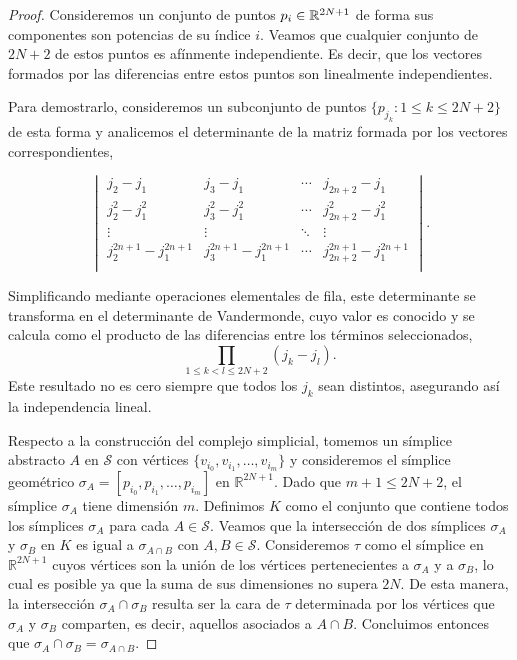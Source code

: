 \begin{proof}
	Consideremos un conjunto de puntos \(p_i \in \mathbb{R}^{2N+1} \) de forma sus componentes son potencias de su índice \(i\). Veamos que cualquier conjunto de \(2N+2\) de estos puntos es afínmente independiente. Es decir, que los vectores formados por las diferencias entre estos puntos son linealmente independientes.
	
	Para demostrarlo, consideremos un subconjunto de puntos \(\{p_{j_k} : 1 \leq k \leq 2N+2\}\) de esta forma y analicemos el determinante de la matriz formada por los vectores correspondientes,
	
	\[
	\begin{vmatrix}
		j_{2} - j_{1}              & j_{3} - j_{1}              & \cdots & j_{2n+2}- j_{1}               \\
		j_{2}^{2} - j_{1}^{2}      & j_{3}^{2} - j_{1}^{2}      & \cdots & j_{2n+2}^{2} - j_{1}^{2}      \\
		\vdots                     & \vdots                     & \ddots & \vdots                        \\
		j_{2}^{2n+1}- j_{1}^{2n+1} & j_{3}^{2n+1}- j_{1}^{2n+1} & \cdots & j_{2n+2}^{2n+1}- j_{1}^{2n+1} \\
	\end{vmatrix}
	.
	\]
	
	Simplificando mediante operaciones elementales de fila, este determinante se transforma en el determinante de Vandermonde, cuyo valor es conocido y se calcula como el producto de las diferencias entre los términos seleccionados, \[\prod_{1 \leq k < l \leq 2N+2}(j_k - j_l).\] Este resultado no es cero siempre que todos los \(j_k\) sean distintos, asegurando así la independencia lineal.
	
	Respecto a la construcción del complejo simplicial, tomemos un símplice abstracto \(A\) en \(\mathcal{S}\) con vértices \(\{v_{i_0}, v_{i_1}, \ldots, v_{i_m}\}\) y consideremos el símplice geométrico \(\sigma_A = [p_{i_0}, p_{i_1}, \ldots, p_{i_m}]\) en \(\mathbb{R}^{2N+1}\). Dado que \(m+1 \leq 2N + 2\), el símplice \(\sigma_A\) tiene dimensión \(m\). Definimos \(K\) como el conjunto que contiene todos los símplices \(\sigma_A\) para cada \(A \in \mathcal{S}\). Veamos que la intersección de dos símplices \(\sigma_A\) y \(\sigma_B\) en \(K\) es igual a \(\sigma_{A \cap B}\) con $A,B \in \mathcal{S}$. Consideremos $\tau$ como el símplice en $\mathbb{R}^{2N+1}$ cuyos vértices son la unión de los vértices pertenecientes a $\sigma_{A}$ y a $\sigma_{B}$, lo cual es posible ya que la suma de sus dimensiones no supera $2N$. De esta manera, la intersección $\sigma_{A}
	\cap \sigma_{B}$ resulta ser la cara de $\tau$ determinada por los vértices que $\sigma_{A}$ y $\sigma_{B}$ comparten, es decir, aquellos asociados a $A \cap B$.	Concluimos entonces que $\sigma_{A} \cap \sigma_{B} = \sigma_{A \cap B}$.
\end{proof}

